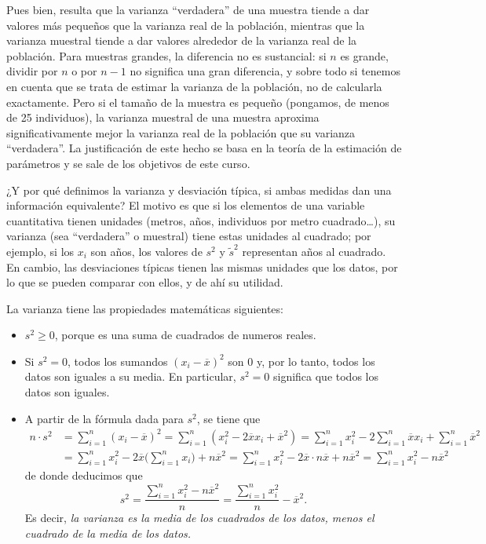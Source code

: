 \documentclass[]{book}
\theoremstyle{definition}
\theoremstyle{definition}
\theoremstyle{definition}
\theoremstyle{remark}
\begin{document}
Pues bien, resulta que la varianza ``verdadera'' de una muestra tiende a dar valores más pequeños que la varianza real de la población, mientras que la varianza muestral tiende a dar valores alrededor de la varianza real de la población. Para muestras grandes, la diferencia no es sustancial: si \(n\) es grande, dividir por \(n\) o por \(n-1\) no significa una gran diferencia, y sobre todo si tenemos en cuenta que se trata de estimar la varianza de la población, no de calcularla exactamente. Pero si el tamaño de la muestra es pequeño (pongamos, de menos de 25 individuos), la varianza muestral de una muestra aproxima significativamente mejor la varianza real de la población que su varianza ``verdadera''. La justificación de este hecho se basa en la teoría de la estimación de parámetros y se sale de los objetivos de este curso.

¿Y por qué definimos la varianza y desviación típica, si ambas medidas dan una información equivalente? El motivo es que si los elementos de una variable cuantitativa tienen unidades (metros, años, individuos por metro cuadrado\ldots{}), su varianza (sea ``verdadera'' o muestral) tiene estas unidades al cuadrado; por ejemplo, si los \(x_i\) son años, los valores de \(s^2\) y \(\tilde{s}^2\) representan años al cuadrado. En cambio, las desviaciones típicas tienen las mismas unidades que los datos, por lo que se pueden comparar con ellos, y de ahí su utilidad.

La varianza tiene las propiedades matemáticas siguientes:

\begin{itemize}
\item
  \(s^2\geqslant 0\), porque es una suma de cuadrados de numeros reales.
\item
  Si \(s^2=0\), todos los sumandos \((x_i-\overline{x})^2\) son 0 y, por lo tanto, todos los datos son iguales a su media. En particular, \(s^2=0\) significa que todos los datos son iguales.
\item
  A partir de la fórmula dada para \(s^2\), se tiene que
  \[
  \begin{array}{rl}
  n\cdot s^2 & \displaystyle = \sum_{i=1}^n (x_i-\overline{x})^2=
  \sum_{i=1}^n (x_i^2-2\overline{x}x_i+\overline{x}^2)=
  \sum_{i=1}^n x_i^2-2\sum_{i=1}^n\overline{x}x_i+\sum_{i=1}^n\overline{x}^2\\[2ex]
  &  \displaystyle =
  \sum_{i=1}^n x_i^2-2\overline{x}\Big(\sum_{i=1}^n x_i\Big)+n\overline{x}^2=
  \sum_{i=1}^n x_i^2-2\overline{x}\cdot n\overline{x}+n\overline{x}^2=
  \sum_{i=1}^n x_i^2-n\overline{x}^2
  \end{array}
  \]
  de donde deducimos que
  \[
  s^2=\frac{\sum_{i=1}^n x_i^2-n\overline{x}^2}{n}=
   \frac{\sum_{i=1}^n x_i^2}{n}-\overline{x}^2.
  \]
  Es decir, \emph{la varianza es la media de los cuadrados de los datos, menos el cuadrado de la media de los datos.}
\end{itemize}
\end{document}
